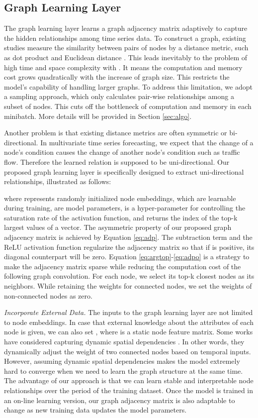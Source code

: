 \documentclass[sigconf]{acmart}
\begin{document}
\subsection{Graph Learning Layer}
The graph learning layer learns a graph adjacency matrix adaptively to capture the hidden relationships among time series data.  To construct a graph, existing studies measure the similarity between pairs of nodes by a distance metric, such as dot product and Euclidean distance \cite{li2018diffusion}.  This leads inevitably to the problem of high time and space complexity with . It means the computation and memory cost grows quadratically with the increase of graph size. This restricts the model's capability of handling larger graphs. To address this limitation, we adopt a sampling approach, which only calculates pair-wise relationships among a subset of nodes. This cuts off the bottleneck of computation and memory in each minibatch. More details will be provided in Section \ref{sec:algo}. 

Another problem is that existing distance metrics are often symmetric or bi-directional. In multivariate time series forecasting, we expect that the change of a node's condition causes the change of another node's condition such as traffic flow. Therefore the learned relation is supposed to be uni-directional. Our proposed graph learning layer is specifically designed to extract uni-directional relationships, illustrated as follows:

where  represents randomly initialized node embeddings, which are learnable during training,  are model parameters,  is a hyper-parameter for controlling the saturation rate of the activation function, and  returns the index of the top-k largest values of a vector. The asymmetric property of our proposed graph adjacency matrix is achieved by Equation \ref{eq:adp}. The subtraction term and the ReLU activation function regularize the adjacency matrix so that if  is positive, its diagonal counterpart  will be zero.  Equation \ref{eq:argtop}-\ref{eq:adpo} is a strategy to make the adjacency matrix sparse while reducing the computation cost of the following graph convolution. For each node, we select its top-k closest nodes as its neighbors. While retaining the weights for connected nodes, we set the weights of non-connected nodes as zero. 


\textit{Incorporate External Data.} The inputs to the graph learning layer are not limited to node embeddings. In case that external knowledge about the attributes of each node is given, we can also set , where  is a static node feature matrix. Some works have considered capturing dynamic spatial dependencies \cite{guo2019attention,shi2019two}. In other words, they dynamically adjust the weight of two connected nodes based on temporal inputs. However, assuming dynamic spatial dependencies makes the model extremely hard to converge when we need to learn the graph structure at the same time. The advantage of our approach is that we can learn stable and interpretable node relationships over the period of the training dataset. Once the model is trained in an on-line learning version, our graph adjacency matrix is also adaptable to change as new training data updates the model parameters.
\end{document}
